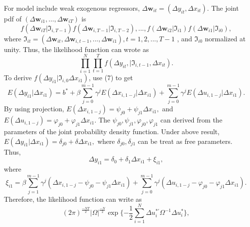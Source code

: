 \documentclass[12pt,a4paper,hyperref]{article}
\begin{document}
\vspace{5mm} For model include weak exogenous regressors, $\Delta \boldsymbol{w}_{it}=(\Delta y_{it}, \Delta x_{it})$. The joint pdf of $(\Delta \boldsymbol{w}_{i1},\ldots, \Delta \boldsymbol{w}_{iT})$ is
\begin{equation}
f(\Delta \boldsymbol{w}_{iT}|\boldsymbol{\Im}_{i,T-1})f(\Delta \boldsymbol{w}_{i,T-1}|\boldsymbol{\Im}_{i,T-2}),...,f(\Delta \boldsymbol{w}_{i2}|\boldsymbol{\Im}_{i1})f(\Delta \boldsymbol{w}_{i1}|\boldsymbol{\Im}_{i0}),
\end{equation}
where $\boldsymbol{\Im}_{it}=(\Delta \boldsymbol{w}_{it},\Delta \boldsymbol{w}_{i,t-1},...,\Delta \boldsymbol{w}_{i1}), t=1,2,...,T-1$ , and $\boldsymbol{\Im}_{i0}$ normalized at unity.
Thus, the likelihood function can wrote as
\begin{equation}
\prod^{N}_{i=1} \prod^{T}_{t=1} f(\Delta y_{it},\mid \boldsymbol{\Im}_{i,t-1}, \Delta x_{it}).
\end{equation}
To derive $f(\Delta y_{i1}|\boldsymbol{\Im}_{i,0} \Delta x_{i1})$, \citet{Hsiao:2002} use (7) to get
\begin{equation}
E(\Delta y_{i1}|\Delta x_{i1})=b^{\ast}+\beta \sum _{j=0}^{m-1} \gamma^{j} E(\Delta x_{i,1-j}|\Delta x_{i1})+ \sum _{j=0}^{m-1} \gamma^{j}E(\Delta u_{i,1-j}|\Delta x_{i1}).
\end{equation}
By using projection, $E(\Delta x_{i,1-j})=\psi _{j0}+\psi _{j1} \Delta x_{i1},$ and $E(\Delta u_{i,1-j})=\varphi_{j0}+\varphi_{j1} \Delta x_{i1}.$ The $\psi _{j0}, \psi _{j1}, \varphi_{j0}, \varphi_{j1}$ can derived from the parameters of the joint probability density function. Under above result, $E(\Delta y_{i1}|\Delta x_{i1})=\delta_{j0}+ \delta \Delta x_{i1},$ where $\delta_{j0}, \delta_{j1}$ can be treat as free parameters.
Thus,
\begin{equation}
\Delta y_{i1}= \delta_{0}+\delta_{1} \Delta x_{i1}+\xi_{i1} ,
\end{equation}
where
\begin{equation}
\xi_{i1} = \beta \sum ^{m-1}_{j=1} \gamma^{j}(\Delta x_{i,1-j}-\psi_{j0}-\psi_{j1}\Delta x_{i1})+\sum^{m-1}_{j=0}\gamma^{j}(\Delta u_{i,1-j}-\varphi_{j0}-\varphi_{j1}\Delta x_{i1}).
\end{equation}
Therefore, the likelihood function can write as
\begin{equation}
(2\pi)^{\frac{-NT}{2}}|\Omega|^{\frac{-N}{2}}\exp \{-\frac{1}{2} \sum_{i=1}^{N}{\Delta u_{i}^{\ast'}\Omega^{-1}\Delta u_{i}^{\ast}} \} ,
\end{equation}
\end{document}
